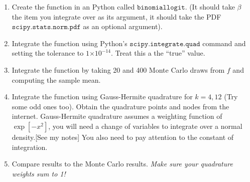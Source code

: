\documentclass{article}
\providecommand{\e}[1]{\ensuremath{\times 10^{#1}}}
\begin{document}
\begin{enumerate}
\item Create the function in an Python called $\mathtt{binomiallogit}$. (It should take $\beta$ the item you integrate over as its argument, it should take the PDF $\mathtt{scipy.stats.norm.pdf}$ as an optional argument).

\item Integrate the function using Python's $\mathtt{scipy.integrate.quad}$ command and setting the tolerance to $1\e{-14}$.  Treat this a the ``true'' value.
\begin{comment}
\begin{verbatim}
[Ftrue,nevals]=quad(@binomiallogit,-10,10,1e-14);
z=randn(100,1);
Fmc=sum(binomiallogitnopdf(z))./length(z);
Fgh=binomiallogitnopdf(x)'*(w./sum(w));
\end{verbatim}
\end{comment}

\item Integrate the function by taking 20 and 400 Monte Carlo draws from $f$ and computing the sample mean.
\item Integrate the function using Gauss-Hermite quadrature for $k=4, 12$ (Try some odd ones too). Obtain the quadrature points and nodes from the internet. Gauss-Hermite quadrature assumes a weighting function of $\exp[-x^2]$, you will need a change of variables to integrate over a normal density.[See my notes] You also need to pay attention to the constant of integration.
\item Compare results to the Monte Carlo results. \textit{Make sure your quadrature weights sum to 1!}
\begin{comment}
\begin{table}[htdp]
\caption{True value: 0.5515}
\begin{center}
\begin{tabular}{l r r r }
Method & Points & Error\\
quad & 2597 & 1e-14 \\
monte carlo & 100 & 0.0166\\
Gauss Hermite & 4 & 0.0044234\\
Gauss Hermite & 12 & 0.0044469\\
\end{tabular}
\end{center}
\end{table}
\end{comment}


\end{enumerate}
\end{document}
